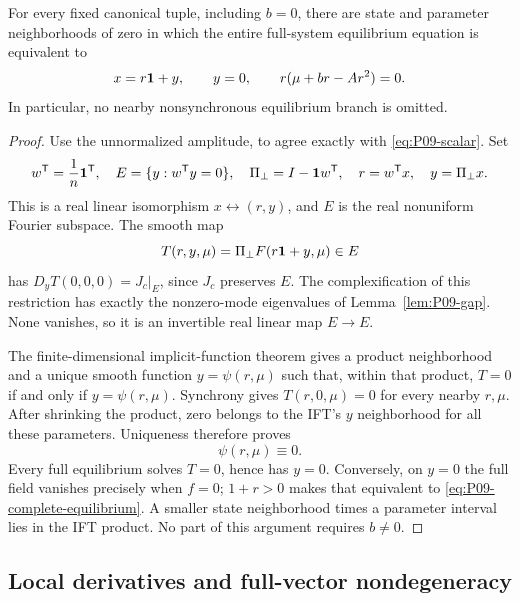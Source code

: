 \begin{theorem}
\label{thm:P09-reduction}
For every fixed canonical tuple, including $b=0$, there are state and
parameter neighborhoods of zero in which the entire full-system
equilibrium equation is equivalent to
\begin{equation}
 x=r\mathbf{1}+y,\qquad y=0,\qquad r(\mu+br-Ar^2)=0.
 \label{eq:P09-complete-equilibrium}
\end{equation}
In particular, no nearby nonsynchronous equilibrium branch is omitted.
\end{theorem}
\begin{proof}
Use the unnormalized amplitude, to agree exactly with
\eqref{eq:P09-scalar}. Set
\[
 w^{\mathsf T}=\frac1n\mathbf{1}^{\mathsf T},\quad
 E=\{y:w^{\mathsf T}y=0\},\quad \Pi_\perp=I-\mathbf{1} w^{\mathsf T},
 \quad r=w^{\mathsf T}x,\quad y=\Pi_\perp x.
\]
This is a real linear isomorphism $x\leftrightarrow(r,y)$, and $E$ is
the real nonuniform Fourier subspace. The smooth map
\[
 T(r,y,\mu)=\Pi_\perp F(r\mathbf{1}+y,\mu)\in E
\]
has $D_yT(0,0,0)=J_c|_E$, since $J_c$ preserves $E$.
The complexification of this restriction has exactly the nonzero-mode
eigenvalues of Lemma~\ref{lem:P09-gap}. None vanishes, so it is an
invertible real linear map $E\to E$.

The finite-dimensional implicit-function theorem gives a product
neighborhood and a unique smooth function $y=\psi(r,\mu)$ such that,
within that product, $T=0$ if and only if $y=\psi(r,\mu)$.
Synchrony gives $T(r,0,\mu)=0$ for every nearby $r,\mu$.
After shrinking the product, zero belongs to the IFT's $y$ neighborhood
for all these parameters. Uniqueness therefore proves
\begin{equation}
 \boxed{\psi(r,\mu)\equiv0.}\label{eq:P09-psi-zero}
\end{equation}
Every full equilibrium solves $T=0$, hence has $y=0$.
Conversely, on $y=0$ the full field vanishes precisely when $f=0$;
$1+r>0$ makes that equivalent to \eqref{eq:P09-complete-equilibrium}.
A smaller state neighborhood times a parameter interval lies in the
IFT product. No part of this argument requires $b\ne0$.
\end{proof}

\subsection{Local derivatives and full-vector nondegeneracy}

